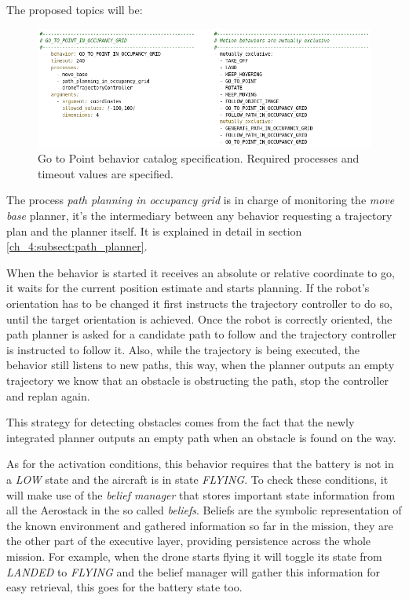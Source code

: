   The proposed topics will be:

  

  \begin{figure}[!h]
    \centering
    \includegraphics[width=\textwidth]{./Figures/BehaviorGTPCatalog.png}
    \caption{Go to Point behavior catalog specification. Required processes and timeout values are specified.}
    \label{ch_4:fig:behav_gtp_catalog}
  \end{figure}


  The process \textit{path planning in occupancy grid} is in charge of monitoring the \textit{move base} planner, it's the intermediary between any behavior requesting a trajectory plan and the planner itself. It is explained in detail in section \ref{ch_4:subsect:path_planner}.

  When the behavior is started it receives an absolute or relative coordinate to go, it waits for the current position estimate and starts planning. If the robot's orientation has to be changed it first instructs the trajectory controller to do so, until the target orientation is achieved. Once the robot is correctly oriented, the path planner is asked for a candidate path to follow and the trajectory controller is instructed to follow it. Also, while the trajectory is being executed, the behavior still listens to new paths, this way, when the planner outputs an empty trajectory we know that an obstacle is obstructing the path, stop the controller and replan again. 

  This strategy for detecting obstacles comes from the fact that the newly integrated planner outputs an empty path when an obstacle is found on the way.

  As for the activation conditions, this behavior requires that the battery is not in a \textit{LOW} state and the aircraft is in state \textit{FLYING}. To check these conditions, it will make use of the \textit{belief manager} that stores important state information from all the Aerostack in the so called \textit{beliefs}. Beliefs are the symbolic representation of the known environment and gathered information so far in the mission, they are the other part of the executive layer, providing persistence across the whole mission. For example, when the drone starts flying it will toggle its state from \textit{LANDED} to \textit{FLYING} and the belief manager will gather this information for easy retrieval, this goes for the battery state too.

